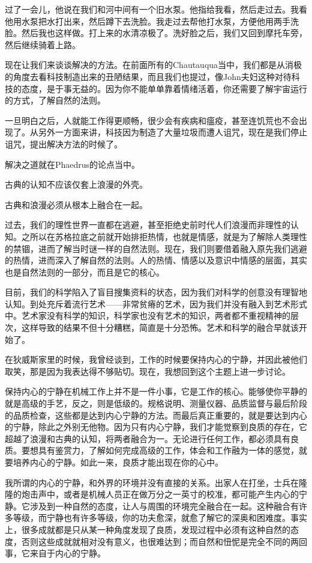 \documentclass[UTF8]{article}
\begin{document}
\par 过了一会儿，他说在我们和河中间有一个旧水泵。他指给我看，然后走过去。我看他用水泵把水打出来，然后蹲下去洗脸。我走过去帮他打水泵，方便他用两手洗脸。然后我也这样做。打上来的水清凉极了。洗好脸之后，我们又回到摩托车旁，然后继续骑着上路。
\par 现在让我们来谈谈解决的方法。在前面所有的Chautauqua当中，我们都是从消极的角度去看科技制造出来的丑陋结果，而且我们也提过，像John夫妇这种对待科技的态度，是于事无益的。因为你不能单单靠着情绪活着，你还需要了解宇宙运行的方式，了解自然的法则。
\par 一旦明白之后，人就能工作得更顺畅，很少会有疾病和瘟疫，甚至连饥荒也不会出现了。从另外一方面来讲，科技因为制造了大量垃圾而遭人诅咒，现在是我们停止诅咒，提出解决方法的时候了。
\par 解决之道就在Phaedrus的论点当中。
\par 古典的认知不应该仅套上浪漫的外壳。
\par 古典和浪漫必须从根本上融合在一起。
\par 过去，我们的理性世界一直都在逃避，甚至拒绝史前时代人们浪漫而非理性的认知。之所以在苏格拉底之前就开始排拒热情，也就是情感，就是为了解除人类理性的禁锢，进而了解当时谜一样的自然法则。现在，我们则要借着融入原先我们逃避的热情，进而深入了解自然的法则。人的热情、情感以及意识中情感的层面，其实也是自然法则的一部分，而且是它的核心。
\par 目前，我们的科学陷入了盲目搜集资料的状态，因为我们对科学的创意没有理智地认知。到处充斥着流行艺术——非常贫瘠的艺术，因为我们并没有融入到艺术形式中。艺术家没有科学的知识，科学家也没有艺术的知识，两者都不重视精神的层次，这样导致的结果不但十分糟糕，简直是十分恐怖。艺术和科学的融合早就该开始了。
\par 在狄威斯家里的时候，我曾经谈到，工作的时候要保持内心的宁静，并因此被他们取笑，那是因为我表达得不够贴切。现在，我想回到这个主题上进一步讨论。
\par 保持内心的宁静在机械工作上并不是一件小事，它是工作的核心。能够使你平静的就是高级的手艺，反之，则是低级的。规格说明、测量仪器、品质监督与最后阶段的品质检查，这些都是达到内心宁静的方法。而最后真正重要的，就是要达到内心的宁静，除此之外别无他物。因为只有内心宁静，我们才能觉察到良质的存在，它超越了浪漫和古典的认知，将两者融合为一。无论进行任何工作，都必须具有良质。要想具有鉴赏力，了解如何完成高级的工作，体会和工作融为一体的感觉，就要培养内心的宁静。如此一来，良质才能出现在你的心中。
\par 我所谓的内心的宁静，和外界的环境并没有直接的关系。出家人在打坐，士兵在隆隆的炮击声中，或者是机械人员正在做万分之一英寸的校准，都可能产生内心的宁静。它涉及到一种自然的态度，让人与周围的环境完全融合在一起。这种融合有许多等级，而宁静也有许多等级，你的功夫愈深，就愈了解它的深奥和困难度。事实上，很多成就都是只从某一种角度发现了良质，发现过程中必须有这种自然的态度，否则这些成就就相对没有意义，也很难达到；而自然和忸怩是完全不同的两回事，它来自于内心的宁静。
\end{document}
